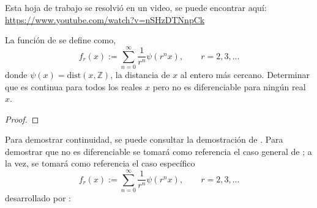 


Esta hoja de trabajo se resolvió en un video, se puede encontrar aquí:\\ \textcolor{blue}{\href{https://www.youtube.com/watch?v=nSHzDTNnpCk}{https://www.youtube.com/watch?v=nSHzDTNnpCk}}
\begin{tcolorbox}[colback=black!15,colframe=black!1!black,title=Problema]
La función de  se define como, 
$$f_r(x):= \sum_{n=0}^{\infty}\frac{1}{r^n}\psi(r^nx), \qquad r=2,3,...$$
donde $\psi(x)=\text{dist}(x, \mathbb{Z})$, la distancia de $x$ al entero más cercano. Determinar que es continua para todos los reales $x$ pero no es diferenciable para ningún real $x$. 

\end{tcolorbox}
\begin{proof}
\end{proof}


Para demostrar continuidad, se puede consultar la demostración de \cite{shidfar1990holder}. Para demostrar que no es diferenciable se tomará como referencia el caso general de \cite{spurrier2004continuous}; a la vez, se tomará como referencia el caso específico 
$$f_r(x):= \sum_{n=0}^{\infty}\frac{1}{r^n}\psi(r^nx), \qquad r=2,3,...$$
desarrollado por \cite{allaart2014level}: \newline


